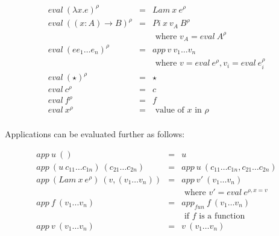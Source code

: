 \documentclass[acmsmall]{acmart}
\begin{document}
\begin{equation*}
  \begin{aligned}
    eval \: (\lambda x . e)^{\rho}   & = & Lam \: x \: e^{\rho}                                            \\
    eval \: ((x:A) \to B)^{\rho}     & = & Pi \: x \: v_A \: B^{\rho}                                      \\
                                     &   & \textrm{ where } v_A = eval \: A^{\rho}                         \\
    eval \: (e e_1 \dots e_n)^{\rho} & = & app \: v \: v_1 \dots v_n                                       \\
                                     &   & \textrm{ where } v = eval \: e^{\rho}, v_i = eval \: e_i^{\rho} \\
    eval \: (\star)^{\rho}           & = & \star                                                           \\
    eval \: c^{\rho}                 & = & c                                                               \\
    eval \: f^{\rho}                 & = & f                                                               \\
    eval \: x^{\rho}                 & = & \textrm{ value of } x \textrm{ in } \rho                        \\
  \end{aligned}
\end{equation*}

Applications can be evaluated further as follows:

\begin{equation*}
  \begin{aligned}
    app \: u \: ()                                             & = & u                                                      \\
    app \: (u \: c_{11} \dots c_{1n}) \: (c_{21} \dots c_{2n}) & = & app \: u \: (c_{11} \dots c_{1n}, c_{21} \dots c_{2n}) \\
    app \: (Lam \: x \: e^{\rho}) \: (v,(v_1 \dots v_n))       & = & app \: v' \: (v_1 \dots v_n)                           \\
                                                               &   & \textrm{ where } v' = eval \: e^{\rho,x=v}             \\
    app \: f \: (v_1 ... v_n)                                  & = & app_{fun} \: f \: (v_1 \dots v_n)                      \\
                                                               &   & \textrm{ if } f \textrm{ is a function }               \\
    app \: v \: (v_1 \dots v_n)                                & = & v \: (v_1 \dots v_n)                                   \\
  \end{aligned}
\end{equation*}
\end{document}
